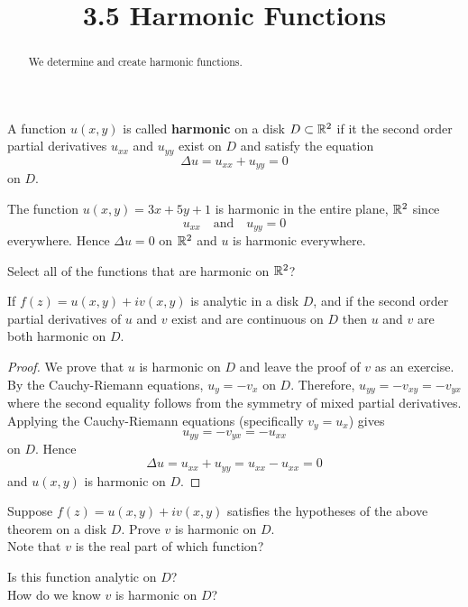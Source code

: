 \documentclass[handout]{ximera}
\title{3.5 Harmonic Functions}
\begin{document}
\begin{abstract}
We determine and create harmonic functions.
\end{abstract}

\maketitle


\begin{definition}
A function $u(x,y)$ is called {\bf harmonic} on a disk $D \subset \mathbb R^2$ if it the second order partial derivatives
$u_{xx}$ and $u_{yy}$ exist on $D$ and satisfy the equation
\[
\Delta u = u_{xx} + u_{yy} = 0
\]
on $D$.
\end{definition}

\begin{example}
The function $u(x,y) = 3x + 5y +1$ is harmonic in the entire plane, $\mathbb R^2$ since
\[
u_{xx} \quad \text{and} \quad u_{yy} = 0
\]
everywhere. Hence $\Delta u = 0$ on $\mathbb R^2$ and $u$ is harmonic everywhere.
\end{example}

\begin{problem}
Select all of the functions that are harmonic on $\mathbb R^2$?\\
\begin{selectAll}
\end{selectAll}
\end{problem}


\begin{theorem}
If $f(z) = u(x,y) + iv(x,y)$ is analytic in a disk $D$, and if the second order 
partial derivatives of $u$ and $v$ exist and are continuous on $D$ then $u$ and $v$ are both harmonic on $D$.
\end{theorem}
\begin{proof}
We prove that $u$ is harmonic on $D$ and leave the proof of $v$ as an exercise.\\
By the Cauchy-Riemann equations, $u_y = -v_x$ on $D$.  Therefore, $u_{yy} = -v_{xy} = -v_{yx}$ where the 
second equality follows from the symmetry of mixed partial derivatives. Applying the Cauchy-Riemann 
equations (specifically $v_y = u_x$)  gives
\[
u_{yy} = -v_{yx} = -u_{xx}
\]
on $D$. Hence
\[
\Delta u = u_{xx} + u_{yy} = u_{xx} - u_{xx} = 0
\]
and $u(x,y)$ is harmonic on $D$.
\end{proof}

\begin{problem}
Suppose $f(z) = u(x,y) + iv(x,y)$ satisfies the hypotheses of the above theorem on a disk $D$. 
Prove $v$ is harmonic on $D$.\\
Note that $v$ is the real part of which function?
\begin{multipleChoice}
\end{multipleChoice}
Is this function analytic on $D$? \\
How do we know $v$ is harmonic on $D$?
\end{problem}
  
\end{document}
